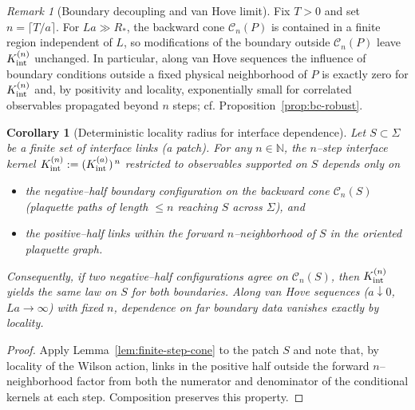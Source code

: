 \documentclass[11pt]{amsart}
\theoremstyle{plain}
\newtheorem{corollary}[theorem]{Corollary}
\theoremstyle{definition}
\theoremstyle{remark}
\newtheorem{remark}[theorem]{Remark}
\begin{document}
\begin{remark}[Boundary decoupling and van Hove limit]\label{rem:cone-decoupling}
Fix $T>0$ and set $n=\lceil T/a\rceil$. For $L a\gg R_*$, the backward cone $\mathcal C_n(P)$ is contained in a finite region independent of $L$, so modifications of the boundary outside $\mathcal C_n(P)$ leave $K^{(n)}_{\rm int}$ unchanged. In particular, along van Hove sequences the influence of boundary conditions outside a fixed physical neighborhood of $P$ is exactly zero for $K^{(n)}_{\rm int}$ and, by positivity and locality, exponentially small for correlated observables propagated beyond $n$ steps; cf. Proposition~\ref{prop:bc-robust}.
\end{remark}

\begin{corollary}[Deterministic locality radius for interface dependence]\label{cor:deterministic-locality}
Let $S\subset \Sigma$ be a finite set of interface links (a patch). For any $n\in\mathbb N$, the $n$--step interface kernel $K^{(n)}_{\rm int}:=(K_{\rm int}^{(a)})^{\,n}$ restricted to observables supported on $S$ depends only on
\begin{itemize}
  \item the negative--half boundary configuration on the backward cone $\mathcal C_n(S)$ (plaquette paths of length $\le n$ reaching $S$ across $\Sigma$), and
  \item the positive--half links within the forward $n$--neighborhood of $S$ in the oriented plaquette graph.
\end{itemize}
Consequently, if two negative--half configurations agree on $\mathcal C_n(S)$, then $K^{(n)}_{\rm int}$ yields the same law on $S$ for both boundaries. Along van Hove sequences ($a\downarrow 0$, $La\to\infty$) with fixed $n$, dependence on far boundary data vanishes exactly by locality.
\end{corollary}
\begin{proof}
Apply Lemma~\ref{lem:finite-step-cone} to the patch $S$ and note that, by locality of the Wilson action, links in the positive half outside the forward $n$--neighborhood factor from both the numerator and denominator of the conditional kernels at each step. Composition preserves this property.
\end{proof}
\end{document}
